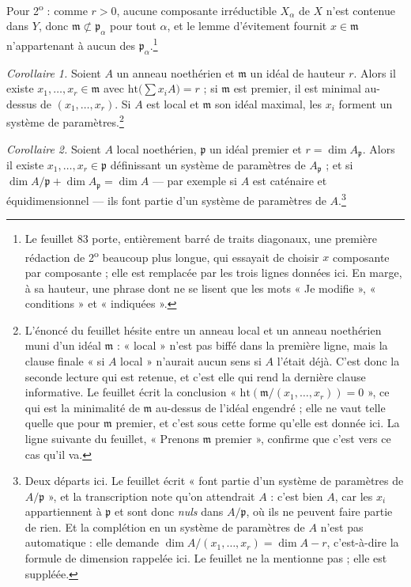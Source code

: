 \documentclass[11pt,a4paper]{article}
\begin{document}
Pour 2\textsuperscript{o} : comme $r > 0$, aucune composante irréductible
$X_{\alpha}$ de $X$ n'est contenue dans $Y$, donc $\mathfrak{m} \not\subset
\mathfrak{p}_{\alpha}$ pour tout $\alpha$, et le lemme d'évitement fournit $x
\in \mathfrak{m}$ n'appartenant à aucun des $\mathfrak{p}_{\alpha}$.\footnote{Le
feuillet 83 porte, entièrement barré de traits diagonaux, une première rédaction
de 2\textsuperscript{o} beaucoup plus longue, qui essayait de choisir $x$
composante par composante ; elle est remplacée par les trois lignes données ici.
En marge, à sa hauteur, une phrase dont ne se lisent que les mots « Je
modifie », « conditions » et « indiquées ».}

\emph{Corollaire 1.} Soient $A$ un anneau noethérien et $\mathfrak{m}$ un idéal
de hauteur $r$. Alors il existe $x_{1},\ldots,x_{r} \in \mathfrak{m}$ avec
$\mathrm{ht}\bigl(\sum x_{i}A\bigr) = r$ ; si $\mathfrak{m}$ est premier, il est
minimal au-dessus de $(x_{1},\ldots,x_{r})$. Si $A$ est local et $\mathfrak{m}$
son idéal maximal, les $x_{i}$ forment un système de
paramètres.\footnote{L'énoncé du feuillet hésite entre un anneau local et un
anneau noethérien muni d'un idéal $\mathfrak{m}$ : « local » n'est pas biffé
dans la première ligne, mais la clause finale « si $A$ local » n'aurait aucun
sens si $A$ l'était déjà. C'est donc la seconde lecture qui est retenue, et
c'est elle qui rend la dernière clause informative. Le feuillet écrit la
conclusion « $\mathrm{ht}(\mathfrak{m}/(x_{1},\ldots,x_{r})) = 0$ », ce qui est
la minimalité de $\mathfrak{m}$ au-dessus de l'idéal engendré ; elle ne vaut
telle quelle que pour $\mathfrak{m}$ premier, et c'est sous cette forme qu'elle
est donnée ici. La ligne suivante du feuillet, « Prenons $\mathfrak{m}$
premier », confirme que c'est vers ce cas qu'il va.}

\emph{Corollaire 2.} Soient $A$ local noethérien, $\mathfrak{p}$ un idéal
premier et $r = \dim A_{\mathfrak{p}}$. Alors il existe $x_{1},\ldots,x_{r} \in
\mathfrak{p}$ définissant un système de paramètres de $A_{\mathfrak{p}}$ ; et si
$\dim A/\mathfrak{p} + \dim A_{\mathfrak{p}} = \dim A$ — par exemple si $A$ est
caténaire et équidimensionnel — ils font partie d'un système de paramètres de
$A$.\footnote{Deux départs ici. Le feuillet écrit « font partie d'un système de
paramètres de $A/\mathfrak{p}$ », et la transcription note qu'on attendrait
$A$ : c'est bien $A$, car les $x_{i}$ appartiennent à $\mathfrak{p}$ et sont
donc \emph{nuls} dans $A/\mathfrak{p}$, où ils ne peuvent faire partie de rien.
Et la complétion en un système de paramètres de $A$ n'est pas automatique : elle
demande $\dim A/(x_{1},\ldots,x_{r}) = \dim A - r$, c'est-à-dire la formule de
dimension rappelée ici. Le feuillet ne la mentionne pas ; elle est suppléée.}
\end{document}
